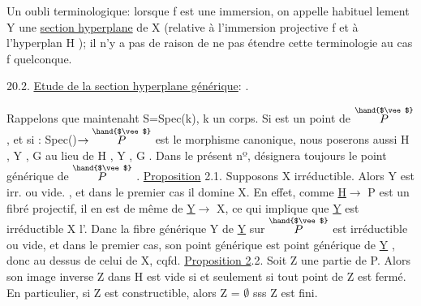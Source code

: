
\margin{$|$}Un oubli terminologique: lorsque f est une immersion, on appelle habituel%
lement Y\hand{$_\zeta$} une \uline{section hyperplane} de X (relative à l'immersion projective
f et à l'hyperplan H  ); il n'y a pas de raison de ne pas étendre cette
terminologie au cas f quelconque.

20.2. \uline{Etude de la section hyperplane générique}:  .

Rappelons que maintenaht S=Spec(k), k un corps. Si \hand{$\eta$} est un point
de $\overset{\hand{$\vee$}}{P}$ ,  et si \hand{$\zeta$}: Spec(\hand{$\eta$})$\to\overset{\hand{$\vee$}}{P}$ est le morphisme canonique, nous poserons
aussi H\hand{$_\eta$} , Y\hand{$_\eta$} , G\hand{$_\eta$} au lieu de H\hand{$_\zeta$} , Y\hand{$_\zeta$} , G\hand{$_\zeta$} . Dans le présent nº, \hand{$\eta$}
désignera toujours le point générique de $\overset{\hand{$\vee$}}{P}$ .
\uline{Proposition} 2.1. Supposons X irréductible. Alors Y\hand{$_\eta$} est irr.  ou vide. ,
et dans le premier cas il domine X. 
En effet, comme \uline{H}$\longrightarrow$ P est un fibré projectif, il en est de même de
\uline{Y}$\longrightarrow$ X, ce qui implique que \uline{Y} est irréductible X l'. Danc la fibre
générique Y   de \uline{Y} sur $\overset{\hand{$\vee$}}{P}$ est irréductible ou vide, et dans le premier cas,
son point générique est point générique de \uline{Y} , donc au dessus de celui de
X, cqfd.
\uline{Proposition 2}.2. Soit Z une partie de P. Alors son image inverse Z\hand{$_\eta$} dans
H\hand{$_\eta$} est vide si et seulement si tout point de Z est fermé. En particulier,
si Z est constructible, alors Z\hand{$_\eta$} = $\emptyset$ sss Z est fini.

